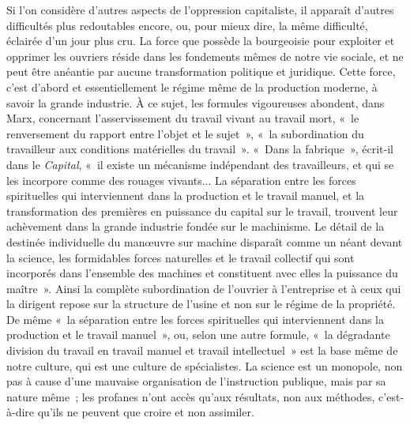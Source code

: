 \documentclass[french,twoside]{book} %
\begin{document}
Si l'on considère d'autres aspects de l'oppression capitaliste, il apparaît d'autres difficultés plus redoutables encore, ou, pour mieux dire, la même difficulté, éclairée d'un jour plus cru. La force que possède la bourgeoisie pour exploiter et opprimer les ouvriers réside dans les fondements mêmes de notre vie sociale, et ne peut être anéantie par aucune transformation politique et juridique. Cette force, c'est d'abord et essentiellement le régime même de la production moderne, à savoir la grande industrie. À ce sujet, les formules vigoureuses abondent, dans Marx, concernant l'asservissement du travail vivant au travail mort, « le renversement du rapport entre l'objet et le sujet », « la subordination du travailleur aux conditions matérielles du travail ». « Dans la fabrique », écrit-il dans le {\itshape Capital}, « il existe un mécanisme indépendant des travailleurs, et qui se les incorpore comme des rouages vivants... La séparation entre les forces spirituelles qui interviennent dans la production et le travail manuel, et la transformation des premières en puissance du capital sur le travail, trouvent leur achèvement dans la grande industrie fondée sur le machinisme. Le détail de la destinée individuelle du manœuvre sur machine disparaît comme un néant devant la science, les formidables forces naturelles et le travail collectif qui sont incorporés dans l'ensemble des machines et constituent avec elles la puissance du maître ». Ainsi la complète subordination de l'ouvrier à l'entreprise et à ceux qui la dirigent repose sur la structure de l'usine et non sur le régime de la propriété. De même « la séparation entre les forces spirituelles qui interviennent dans la production et le travail manuel », ou, selon une autre formule, « la dégradante division du travail en travail manuel et travail intellectuel » est la base même de notre culture, qui est une culture de spécialistes. La science est un monopole, non pas à cause d'une mauvaise organisation de l'instruction publique, mais par sa nature même ; les profanes n'ont accès qu'aux résultats, non aux méthodes, c'est-à-dire qu'ils ne peuvent que croire et non assimiler.\par
\end{document}

